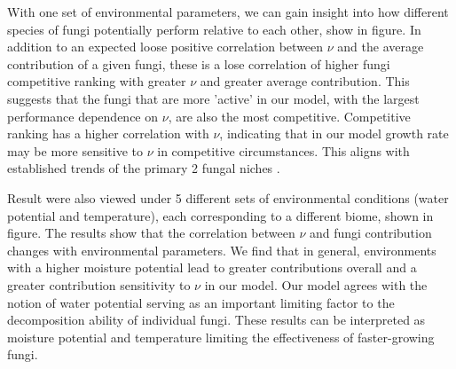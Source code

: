 \documentclass[12pt]{article}
\begin{document}
\begin{multicols}{2}
With one set of environmental parameters, we can gain insight into how different species of fungi potentially perform relative to each other, show in figure. In addition to an expected loose positive correlation between $\nu$ and the average contribution of a given fungi, these is a lose correlation of higher fungi competitive ranking with greater $\nu$ and greater average contribution. This suggests that the fungi that are more 'active' in our model, with the largest performance dependence on $\nu$, are also the most competitive. Competitive ranking has a higher correlation with $\nu$, indicating that in our model growth rate may be more sensitive to $\nu$ in competitive circumstances. This aligns with established trends of the primary 2 fungal niches \cite{Maynard2019}.

Result were also viewed under 5 different sets of environmental conditions (water potential and temperature), each corresponding to a different biome, shown in figure. The results show that the correlation between $\nu$ and fungi contribution changes with environmental parameters. We find that in general, environments with a higher moisture potential lead to greater contributions overall and a greater contribution sensitivity to $\nu$ in our model. Our model agrees with the notion of water potential serving as an important limiting factor to the decomposition ability of individual fungi. These results can be interpreted as moisture potential and temperature limiting the effectiveness of faster-growing fungi.  


\end{multicols}
\end{document}
